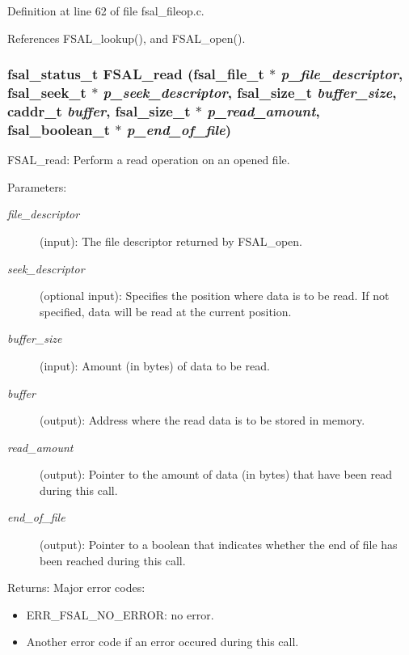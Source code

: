 Definition at line 62 of file fsal\_\-fileop.c.

References FSAL\_\-lookup(), and FSAL\_\-open().
\subsubsection{\setlength{\rightskip}{0pt plus 5cm}fsal\_\-status\_\-t FSAL\_\-read (fsal\_\-file\_\-t $\ast$ {\em p\_\-file\_\-descriptor}, fsal\_\-seek\_\-t $\ast$ {\em p\_\-seek\_\-descriptor}, fsal\_\-size\_\-t {\em buffer\_\-size}, caddr\_\-t {\em buffer}, fsal\_\-size\_\-t $\ast$ {\em p\_\-read\_\-amount}, fsal\_\-boolean\_\-t $\ast$ {\em p\_\-end\_\-of\_\-file})}\label{fsal__fileop_8c_a2}


FSAL\_\-read: Perform a read operation on an opened file.

\begin{Desc}
\item[Parameters:]
\begin{description}
\item[{\em file\_\-descriptor}](input): The file descriptor returned by FSAL\_\-open. \item[{\em seek\_\-descriptor}](optional input): Specifies the position where data is to be read. If not specified, data will be read at the current position. \item[{\em buffer\_\-size}](input): Amount (in bytes) of data to be read. \item[{\em buffer}](output): Address where the read data is to be stored in memory. \item[{\em read\_\-amount}](output): Pointer to the amount of data (in bytes) that have been read during this call. \item[{\em end\_\-of\_\-file}](output): Pointer to a boolean that indicates whether the end of file has been reached during this call.\end{description}
\end{Desc}
\begin{Desc}
\item[Returns:]Major error codes:\begin{itemize}
\item ERR\_\-FSAL\_\-NO\_\-ERROR: no error.\item Another error code if an error occured during this call.\end{itemize}
\end{Desc}


